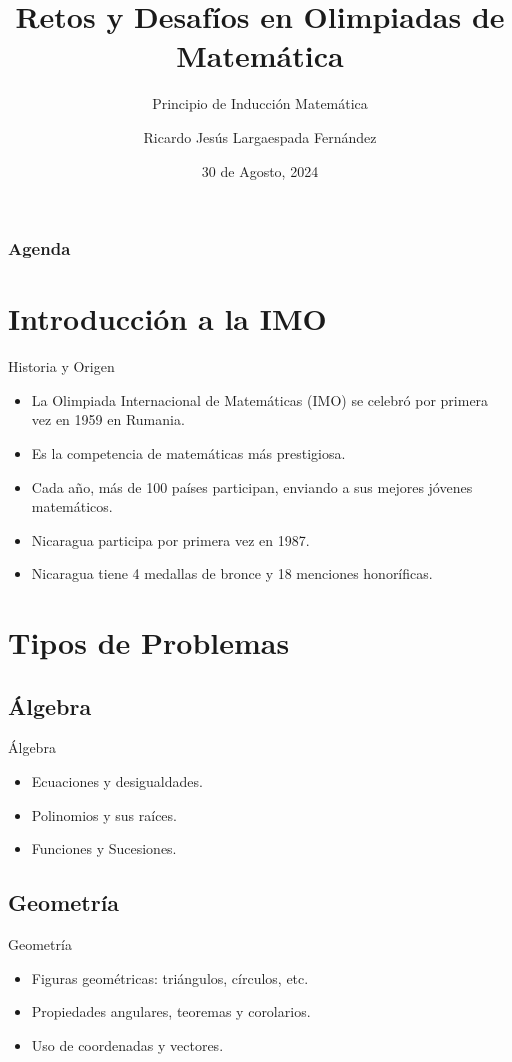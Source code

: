 \documentclass{beamer}
\title{Retos y Desafíos en Olimpiadas de Matemática}
\subtitle{Principio de Inducción Matemática}
\author{Ricardo Jesús Largaespada Fernández}
\institute{Ingeniería de Sistemas, DACTIC, UNI}
\date{30 de Agosto, 2024}
\begin{document}
\frame{\titlepage}

\begin{frame}
\frametitle{Agenda}
\tableofcontents
\end{frame}

\section{Introducción a la IMO}
\begin{frame}{Historia y Origen}
    \begin{itemize}
        \item La Olimpiada Internacional de Matemáticas (IMO) se celebró por primera vez en 1959 en Rumania.
        \item Es la competencia de matemáticas más prestigiosa.
        \item Cada año, más de 100 países participan, enviando a sus mejores jóvenes matemáticos.
        \item Nicaragua participa por primera vez en 1987.
        \item Nicaragua tiene 4 medallas de bronce y 18 menciones honoríficas.
    \end{itemize}
\end{frame}

\section{Tipos de Problemas}
\subsection{Álgebra}
\begin{frame}{Álgebra}
    \begin{itemize}
        \item Ecuaciones y desigualdades.
        \item Polinomios y sus raíces.
        \item Funciones y Sucesiones.
    \end{itemize}
\end{frame}

\subsection{Geometría}
\begin{frame}{Geometría}
    \begin{itemize}
        \item Figuras geométricas: triángulos, círculos, etc.
        \item Propiedades angulares, teoremas y corolarios.
        \item Uso de coordenadas y vectores.
    \end{itemize}
\end{frame}
\end{document}
